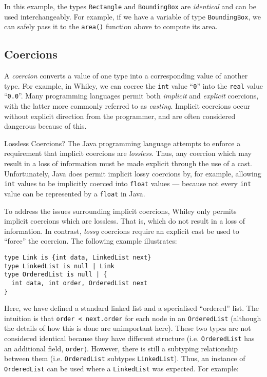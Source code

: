 In this example, the types \lstinline{Rectangle} and \lstinline{BoundingBox} are {\em identical} and can be used interchangeably.  For example, if we have a variable of type \lstinline{BoundingBox}, we can safely pass it to the \lstinline{area()} function above to compute its area.



\subsection{Coercions}

A {\em coercion} converts a value of one type into a corresponding value of another type.  For example, in Whiley, we can coerce the \lstinline{int} value ``\lstinline{0}'' into the \lstinline{real} value ``\lstinline{0.0}''.  Many programming languages permit both {\em implicit} and {\em explicit} coercions, with the latter more commonly referred to as {\em casting}.  Implicit coercions occur without explicit direction from the programmer, and are often considered dangerous because of this.  

\begin{insight}{Lossless Coercions?}
The Java programming language attempts to enforce a requirement that implicit coercions are {\em lossless}.  Thus, any coercion which may result in a loss of information must be made explicit through the use of a cast.  Unfortunately, Java does permit implicit lossy coercions by, for example, allowing \lstinline{int} values to be implicitly coerced into \lstinline{float} values --- because not every \lstinline{int} value can be represented by a \lstinline{float} in Java.
\end{insight}

To address the issues surrounding implicit coercions, Whiley only permits implicit coercions which are lossless.  That is, which do not result in a loss of information.  In contrast, {\em lossy} coercions require an explicit cast be used to ``force'' the coercion.  The following example illustrates:
\begin{lstlisting}
type Link is {int data, LinkedList next}
type LinkedList is null | Link
type OrderedList is null | {
  int data, int order, OrderedList next
}
\end{lstlisting}
Here, we have defined a standard linked list and a specialised
``ordered'' list.  The intuition is that \lstinline{order < next.order} for each node in an \lstinline{OrderedList} (although the details of how this is done are unimportant here).   These two types are not considered identical because they have different structure (i.e. \lstinline{OrderedList} has an additional field, \lstinline{order}).  However, there is still a subtyping relationship between them (i.e. \lstinline{OrderedList} subtypes \lstinline{LinkedList}).  Thus, an instance of \lstinline{OrderedList} can be used where a \lstinline{LinkedList} was expected.  For example:

